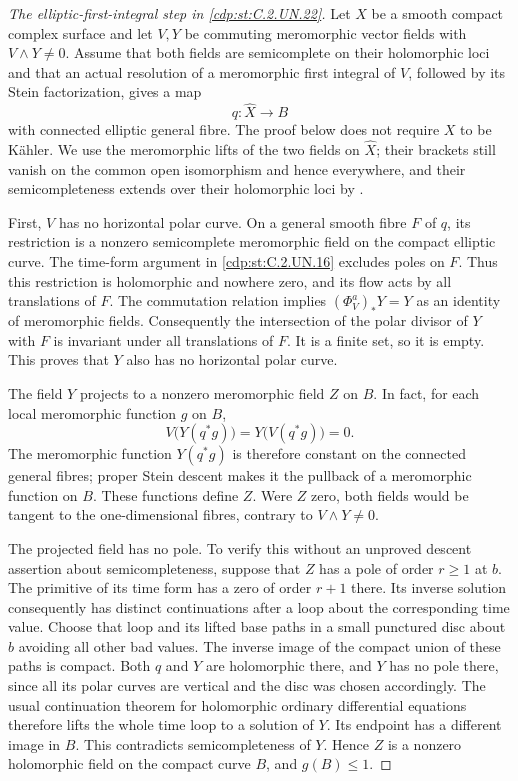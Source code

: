 \begin{proof}[The elliptic-first-integral step in \ref{cdp:st:C.2.UN.22}]
Let $X$ be a smooth compact complex surface and let $V,Y$ be
commuting meromorphic vector fields with $V\wedge Y\ne0$.
Assume that both fields are semicomplete on their holomorphic
loci and that an actual resolution of a meromorphic first
integral of $V$, followed by its Stein factorization, gives
a map
\[
 q:\widehat X\longrightarrow B
 \tag{C.RF.1}\label{cdp:eq:C.RF.1}
\]
with connected elliptic general fibre.  The proof below does
not require $X$ to be K\"ahler.  We use the meromorphic lifts
of the two fields on $\widehat X$; their brackets still vanish
on the common open isomorphism and hence everywhere, and
their semicompleteness extends over their holomorphic loci
by \cite[Theorem~3.3]{Guillot2024}.

First, $V$ has no horizontal polar curve.  On a general
smooth fibre $F$ of $q$, its restriction is a nonzero
semicomplete meromorphic field on the compact elliptic
curve.  The time-form argument in \ref{cdp:st:C.2.UN.16} excludes poles
on $F$.  Thus this restriction is holomorphic and nowhere
zero, and its flow acts by all translations of $F$.
The commutation relation implies
$(\Phi_V^a)_*Y=Y$ as an identity of meromorphic fields.
Consequently the intersection of the polar divisor of $Y$
with $F$ is invariant under all translations of $F$.
It is a finite set, so it is empty.  This proves that
$Y$ also has no horizontal polar curve.

The field $Y$ projects to a nonzero meromorphic field $Z$
on $B$.  In fact, for each local meromorphic function $g$
on $B$,
\[
 V\bigl(Y(q^*g)\bigr)
   =Y\bigl(V(q^*g)\bigr)=0.
\]
The meromorphic function $Y(q^*g)$ is therefore constant
on the connected general fibres; proper Stein descent
makes it the pullback of a meromorphic function on $B$.
These functions define $Z$.  Were $Z$ zero, both fields
would be tangent to the one-dimensional fibres, contrary
to $V\wedge Y\ne0$.

The projected field has no pole.  To verify this without
an unproved descent assertion about semicompleteness,
suppose that $Z$ has a pole of order $r\ge1$ at $b$.
The primitive of its time form has a zero of order $r+1$
there.  Its inverse solution consequently has distinct
continuations after a loop about the corresponding time
value.  Choose that loop and its lifted base paths in a
small punctured disc about $b$ avoiding all other bad
values.  The inverse image of the compact union of these
paths is compact.  Both $q$ and $Y$ are holomorphic there,
and $Y$ has no pole there, since all its polar curves are
vertical and the disc was chosen accordingly.  The usual
continuation theorem for holomorphic ordinary differential
equations therefore lifts the whole time loop to a
solution of $Y$.  Its endpoint has a different image in
$B$.  This contradicts semicompleteness of $Y$.
Hence $Z$ is a nonzero holomorphic field on the compact
curve $B$, and $g(B)\le1$.


\end{proof}
